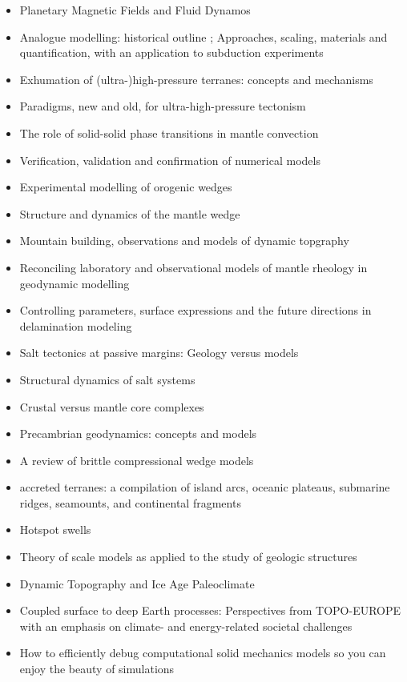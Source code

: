 \begin{itemize}
\item Planetary Magnetic Fields and Fluid Dynamos \cite{jone11}
\item Analogue modelling: historical outline \cite{koyi97}; Approaches, scaling, materials and quantification, with an application to subduction experiments \cite{scst16}
\item Exhumation of (ultra-)high-pressure terranes: concepts and mechanisms \cite{warr13}
\item Paradigms, new and old, for ultra-high-pressure tectonism \cite{hage13}
\item The role of solid-solid phase transitions in mantle convection \cite{fada17}
\item Verification, validation and confirmation of numerical models \cite{orsb94}
\item Experimental modelling of orogenic wedges \cite{grmd12}
\item Structure and dynamics of the mantle wedge \cite{vank03}
\item Mountain building, observations and models of dynamic topgraphy \cite{flgm13,fabc13}
\item Reconciling laboratory and observational models of mantle rheology in geodynamic modelling \cite{king16}
\item Controlling parameters, surface expressions and the future directions in delamination modeling \cite{goue18}
\item Salt tectonics at passive margins: Geology versus models \cite{brfo11}
\item Structural dynamics of salt systems \cite{javs94}
\item Crustal versus mantle core complexes \cite{brst18}
\item Precambrian geodynamics: concepts and models \cite{gery14}
\item A review of brittle compressional wedge models \cite{buit12}
\item accreted terranes: a compilation of island arcs, oceanic
      plateaus, submarine ridges, seamounts, and continental fragments \cite{tebu14}
\item Hotspot swells \cite{kiad14}
\item Theory of scale models as applied to the study of geologic structures \cite{hubb37}
\item Dynamic Topography and Ice Age Paleoclimate \cite{miac20}
\item Coupled surface to deep Earth processes: Perspectives from TOPO-EUROPE
with an emphasis on climate- and energy-related societal challenges \cite{clsk23}
\item How to efficiently debug computational solid mechanics models so
you can enjoy the beauty of simulations \cite{copb23}
\end{itemize}





